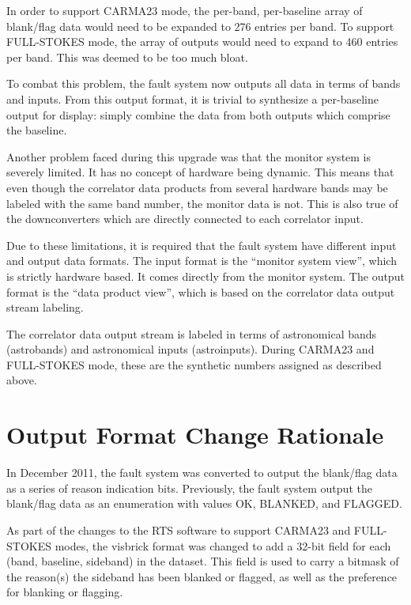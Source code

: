 \documentclass[letterpaper,12pt,oneside,pdftex]{article}
\begin{document}
In order to support CARMA23 mode, the per-band, per-baseline array of blank/flag
data would need to be expanded to 276 entries per band. To support FULL-STOKES
mode, the array of outputs would need to expand to 460 entries per band. This
was deemed to be too much bloat.

To combat this problem, the fault system now outputs all data in terms of bands
and inputs. From this output format, it is trivial to synthesize a per-baseline
output for display: simply combine the data from both outputs which comprise the
baseline.

Another problem faced during this upgrade was that the monitor system is
severely limited. It has no concept of hardware being dynamic. This means that
even though the correlator data products from several hardware bands may be
labeled with the same band number, the monitor data is not. This is also true of
the downconverters which are directly connected to each correlator input.

Due to these limitations, it is required that the fault system have different
input and output data formats. The input format is the ``monitor system view'',
which is strictly hardware based. It comes directly from the monitor system. The
output format is the ``data product view'', which is based on the correlator
data output stream labeling.

The correlator data output stream is labeled in terms of astronomical bands
(astrobands) and astronomical inputs (astroinputs). During CARMA23 and
FULL-STOKES mode, these are the synthetic numbers assigned as described above.

\section{Output Format Change Rationale}

In December 2011, the fault system was converted to output the blank/flag data
as a series of reason indication bits. Previously, the fault system output the
blank/flag data as an enumeration with values OK, BLANKED, and FLAGGED.

As part of the changes to the RTS software to support CARMA23 and FULL-STOKES
modes, the visbrick format was changed to add a 32-bit field for each (band,
baseline, sideband) in the dataset. This field is used to carry a bitmask of the
reason(s) the sideband has been blanked or flagged, as well as the preference
for blanking or flagging.
\end{document}
